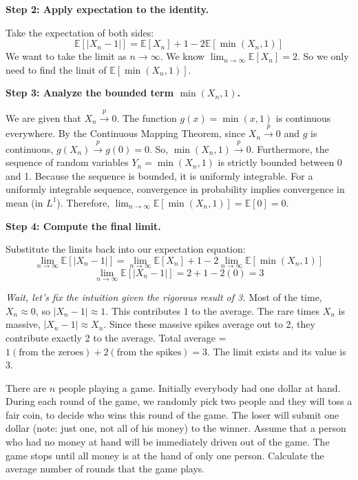 \begin{solution}
\textbf{Step 2: Apply expectation to the identity.}

Take the expectation of both sides:
\[ \mathbb{E}[|X_n - 1|] = \mathbb{E}[X_n] + 1 - 2\mathbb{E}[\min(X_n, 1)] \]
We want to take the limit as $n \to \infty$. We know $\lim_{n \to \infty} \mathbb{E}[X_n] = 2$.
So we only need to find the limit of $\mathbb{E}[\min(X_n, 1)]$.

\textbf{Step 3: Analyze the bounded term $\min(X_n, 1)$.}

We are given that $X_n \xrightarrow{p} 0$.
The function $g(x) = \min(x, 1)$ is continuous everywhere.
By the Continuous Mapping Theorem, since $X_n \xrightarrow{p} 0$ and $g$ is continuous, $g(X_n) \xrightarrow{p} g(0) = 0$.
So, $\min(X_n, 1) \xrightarrow{p} 0$.
Furthermore, the sequence of random variables $Y_n = \min(X_n, 1)$ is strictly bounded between 0 and 1.
Because the sequence is bounded, it is uniformly integrable.
For a uniformly integrable sequence, convergence in probability implies convergence in mean (in $L^1$).
Therefore, $\lim_{n \to \infty} \mathbb{E}[\min(X_n, 1)] = \mathbb{E}[0] = 0$.

\textbf{Step 4: Compute the final limit.}

Substitute the limits back into our expectation equation:
\[ \lim_{n \to \infty} \mathbb{E}[|X_n - 1|] = \lim_{n \to \infty} \mathbb{E}[X_n] + 1 - 2 \lim_{n \to \infty} \mathbb{E}[\min(X_n, 1)] \]
\[ \lim_{n \to \infty} \mathbb{E}[|X_n - 1|] = 2 + 1 - 2(0) = 3 \]

\textit{Wait, let's fix the intuition given the rigorous result of 3.}
Most of the time, $X_n \approx 0$, so $|X_n - 1| \approx 1$. This contributes $1$ to the average.
The rare times $X_n$ is massive, $|X_n - 1| \approx X_n$. Since these massive spikes average out to 2, they contribute exactly 2 to the average.
Total average = $1 (\text{from the zeroes}) + 2 (\text{from the spikes}) = 3$.
The limit exists and its value is 3.
\end{solution}

\begin{exercise}\label{probability:2017:7}
There are $n$ people playing a game. Initially everybody had one dollar at hand. During each round of the game, we randomly pick two people and they will toss a fair coin, to decide who wins this round of the game. The loser will submit one dollar (note: just one, not all of his money) to the winner. Assume that a person who had no money at hand will be immediately driven out of the game. The game stops until all money is at the hand of only one person. Calculate the average number of rounds that the game plays.
\end{exercise}

